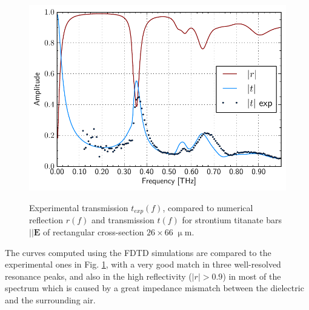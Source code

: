 \begin{figure} \caption{Experimental transmission $t_{exp}(f)$, compared to numerical reflection $r(f)$ and transmission $t(f)$ for strontium titanate bars $||\mathbf E$ of rectangular cross-section $26 \times 66\;\upmu$m. }  \centering \includegraphics[width=12cm]{img/STObar_rt.pdf} \label{fg_STO_bar_rt} \end{figure} 
The curves computed using the FDTD simulations are compared to the experimental ones in Fig. \ref{fg_STO_bar_rt}, with a very good match in three well-resolved resonance peaks, and also in the high reflectivity ($|r| > 0.9$) in most of the spectrum which is caused by a great impedance mismatch between the dielectric and the surrounding air.

